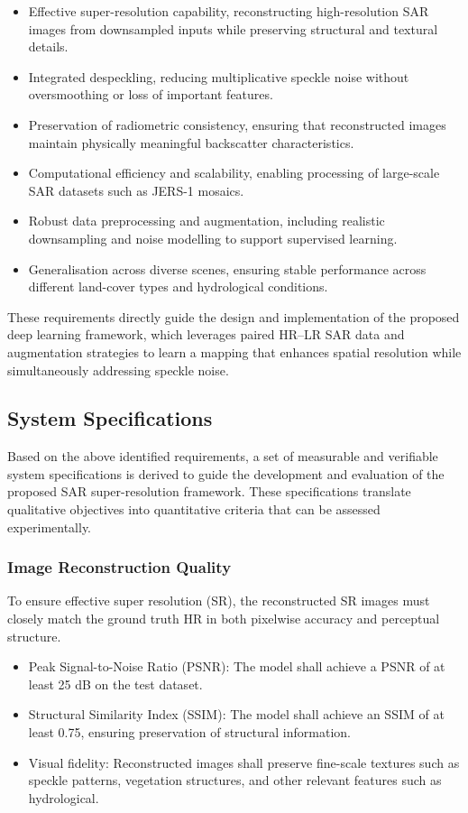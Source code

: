 \documentclass[conference]{IEEEtran}
\begin{document}
\begin{itemize}
    \item Effective super-resolution capability, reconstructing high-resolution SAR images from downsampled inputs while preserving structural and textural details.
    \item Integrated despeckling, reducing multiplicative speckle noise without oversmoothing or loss of important features.
    \item Preservation of radiometric consistency, ensuring that reconstructed images maintain physically meaningful backscatter characteristics.
    \item Computational efficiency and scalability, enabling processing of large-scale SAR datasets such as JERS-1 mosaics.
    \item Robust data preprocessing and augmentation, including realistic downsampling and noise modelling to support supervised learning.
    \item Generalisation across diverse scenes, ensuring stable performance across different land-cover types and hydrological conditions.
\end{itemize}

These requirements directly guide the design and implementation of the proposed deep learning framework, which leverages paired HR--LR SAR data and augmentation strategies to learn a mapping that enhances spatial resolution while simultaneously addressing speckle noise.

\subsection{System Specifications}

Based on the above identified requirements, a set of measurable and verifiable system specifications is derived to guide the development and evaluation of the proposed SAR super-resolution framework. These specifications translate qualitative objectives into quantitative criteria that can be assessed experimentally.

\subsubsection{Image Reconstruction Quality}

To ensure effective super resolution (SR), the reconstructed SR images must closely match the ground truth HR in both pixelwise accuracy and perceptual structure.

\begin{itemize}
    \item Peak Signal-to-Noise Ratio (PSNR): The model shall achieve a PSNR of at least 25 dB on the test dataset.
    \item Structural Similarity Index (SSIM): The model shall achieve an SSIM of at least 0.75, ensuring preservation of structural information.
    \item Visual fidelity: Reconstructed images shall preserve fine-scale textures such as speckle patterns, vegetation structures, and other relevant features such as hydrological.
\end{itemize}
\end{document}
